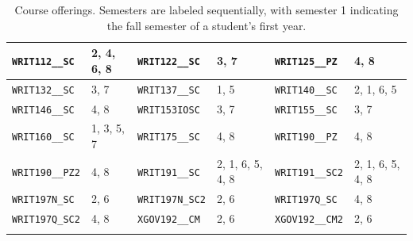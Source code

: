 \begin{longtable}{|l|l||l|l||l|l|}
    \verb|WRIT112__SC| & 2, 4, 6, 8 & \verb|WRIT122__SC| & 3, 7 & \verb|WRIT125__PZ| & 4, 8\\\hline
    \verb|WRIT132__SC| & 3, 7 & \verb|WRIT137__SC| & 1, 5 & \verb|WRIT140__SC| & 2, 1, 6, 5\\\hline
    \verb|WRIT146__SC| & 4, 8 & \verb|WRIT153IOSC| & 3, 7 & \verb|WRIT155__SC| & 3, 7\\\hline
    \verb|WRIT160__SC| & 1, 3, 5, 7 & \verb|WRIT175__SC| & 4, 8 & \verb|WRIT190__PZ| & 4, 8\\\hline
    \verb|WRIT190__PZ2| & 4, 8 & \verb|WRIT191__SC| & 2, 1, 6, 5, 4, 8 & \verb|WRIT191__SC2| & 2, 1, 6, 5, 4, 8\\\hline
    \verb|WRIT197N_SC| & 2, 6 & \verb|WRIT197N_SC2| & 2, 6 & \verb|WRIT197Q_SC| & 4, 8\\\hline
    \verb|WRIT197Q_SC2| & 4, 8 & \verb|XGOV192__CM| & 2, 6 & \verb|XGOV192__CM2| & 2, 6\\\hline
    \caption{Course offerings. Semesters are labeled sequentially, with semester 1 indicating the fall semester of a student's first year.}
    \label{tab:offerings}
\end{longtable}
